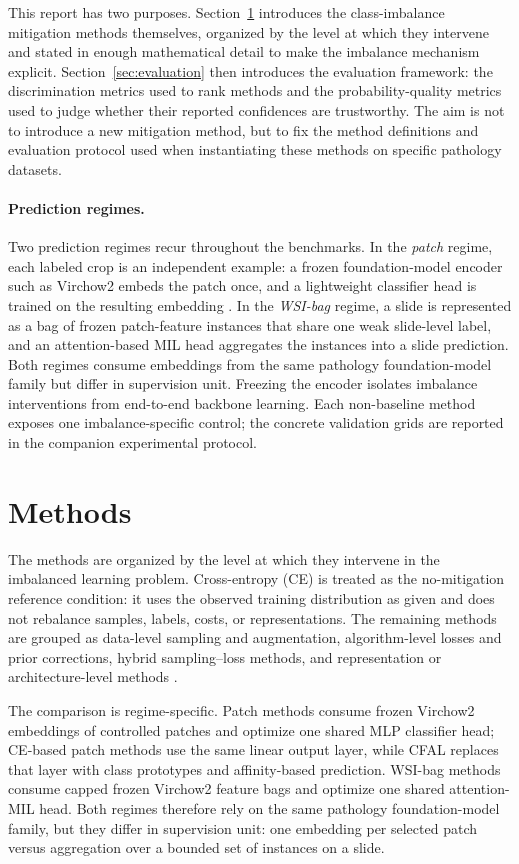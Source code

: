 \documentclass[11pt]{article}
\begin{document}
This report has two purposes. Section~\ref{sec:methods} introduces the class-imbalance mitigation methods themselves, organized by the level at which they intervene and stated in enough mathematical detail to make the imbalance mechanism explicit. Section~\ref{sec:evaluation} then introduces the evaluation framework: the discrimination metrics used to rank methods and the probability-quality metrics used to judge whether their reported confidences are trustworthy. The aim is not to introduce a new mitigation method, but to fix the method definitions and evaluation protocol used when instantiating these methods on specific pathology datasets.

\paragraph{Prediction regimes.}
Two prediction regimes recur throughout the benchmarks. In the \emph{patch} regime, each labeled crop is an independent example: a frozen foundation-model encoder such as Virchow2 embeds the patch once, and a lightweight classifier head is trained on the resulting embedding \citep{zimmermann2024virchow2,vorontsov2024virchow}. In the \emph{WSI-bag} regime, a slide is represented as a bag of frozen patch-feature instances that share one weak slide-level label, and an attention-based MIL head aggregates the instances into a slide prediction. Both regimes consume embeddings from the same pathology foundation-model family but differ in supervision unit. Freezing the encoder isolates imbalance interventions from end-to-end backbone learning. Each non-baseline method exposes one imbalance-specific control; the concrete validation grids are reported in the companion experimental protocol.

\section{Methods}
\label{sec:methods}
The methods are organized by the level at which they intervene in the imbalanced learning problem. Cross-entropy (CE) is treated as the no-mitigation reference condition: it uses the observed training distribution as given and does not rebalance samples, labels, costs, or representations. The remaining methods are grouped as data-level sampling and augmentation, algorithm-level losses and prior corrections, hybrid sampling--loss methods, and representation or architecture-level methods \citep{saini2023tacklingClass,zhang2023deepLong}.

The comparison is regime-specific. Patch methods consume frozen Virchow2 embeddings of controlled patches and optimize one shared MLP classifier head; CE-based patch methods use the same linear output layer, while CFAL replaces that layer with class prototypes and affinity-based prediction. WSI-bag methods consume capped frozen Virchow2 feature bags and optimize one shared attention-MIL head. Both regimes therefore rely on the same pathology foundation-model family, but they differ in supervision unit: one embedding per selected patch versus aggregation over a bounded set of instances on a slide.
\end{document}
